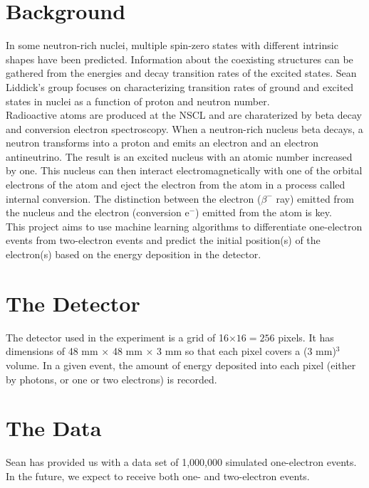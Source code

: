 \documentclass[12pt]{article}
\begin{document}
\section{Background}

\noindent In some neutron-rich nuclei, multiple spin-zero states with different intrinsic shapes have been predicted. Information about the coexisting structures can be gathered from the energies and decay transition rates of the excited states. Sean Liddick's group focuses on characterizing transition rates of ground and excited states in nuclei as a function of proton and neutron number. \\

\noindent Radioactive atoms are produced at the NSCL and are charaterized by beta decay and conversion electron spectroscopy. When a neutron-rich nucleus beta decays, a neutron transforms into a proton and emits an electron and an electron antineutrino. The result is an excited nucleus with an atomic number increased by one. This nucleus can then interact electromagnetically with one of the orbital electrons of the atom and eject the electron from the atom in a process called internal conversion. The distinction between the electron ($\beta^{-}$ ray) emitted from the nucleus and the electron (conversion e$^{-}$) emitted from the atom is key. \\

 
\noindent This project aims to use machine learning algorithms to differentiate one-electron events from two-electron events and predict the initial position(s) of the electron(s) based on the energy deposition in the detector. \\

\section{The Detector}

\noindent The detector used in the experiment is a grid of 16$\times 16=256$ pixels. It has dimensions of 48 mm $\times$ 48 mm $\times$ 3 mm so that each pixel covers a (3 mm)$^3$ volume. In a given event, the amount of energy deposited into each pixel (either by photons, or one or two electrons) is recorded.

\section{The Data}

\noindent Sean has provided us with a data set of 1,000,000 simulated one-electron events. In the future, we expect to receive both one- and two-electron events.\\
\end{document}
